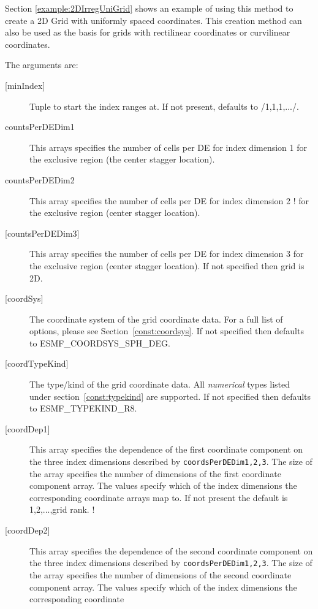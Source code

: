    Section \ref{example:2DIrregUniGrid} shows an example
   of using this method to create a 2D Grid with uniformly spaced
   coordinates.  This creation method can also be used as the basis for
   grids with rectilinear coordinates or curvilinear coordinates.
  
   The arguments are:
   \begin{description}
   \item[{[minIndex]}]
        Tuple to start the index ranges at. If not present, defaults
        to /1,1,1,.../.
   \item[countsPerDEDim1]
       This arrays specifies the number of cells per DE for index dimension 1
       for the exclusive region (the center stagger location).
   \item[countsPerDEDim2]
       This array specifies the number of cells per DE for index dimension 2
  !     for the exclusive region (center stagger location).
   \item[{[countsPerDEDim3]}]
       This array specifies the number of cells per DE for index dimension 3
       for the exclusive region (center stagger location).
       If not specified  then grid is 2D.
   \item[{[coordSys]}]
       The coordinate system of the grid coordinate data.
       For a full list of options, please see Section~\ref{const:coordsys}.
       If not specified then defaults to ESMF\_COORDSYS\_SPH\_DEG.
   \item[{[coordTypeKind]}]
       The type/kind of the grid coordinate data. All {\em numerical} types
       listed under section~\ref{const:typekind} are supported.
       If not specified then defaults to ESMF\_TYPEKIND\_R8.
   \item[{[coordDep1]}]
       This array specifies the dependence of the first
       coordinate component on the three index dimensions
       described by {\tt coordsPerDEDim1,2,3}. The size of the
       array specifies the number of dimensions of the first
       coordinate component array. The values specify which
       of the index dimensions the corresponding coordinate
       arrays map to. If not present the default is 1,2,...,grid rank.
  ! \item[{[coordDep2]}]
       This array specifies the dependence of the second
       coordinate component on the three index dimensions
       described by {\tt coordsPerDEDim1,2,3}. The size of the
       array specifies the number of dimensions of the second
       coordinate component array. The values specify which
       of the index dimensions the corresponding coordinate

\end{description}
